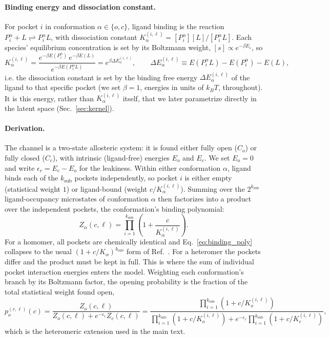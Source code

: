 \documentclass[aps,pre,superscriptaddress,floatfix,longbibliography]{revtex4-2}
\begin{document}
\paragraph{Binding energy and dissociation constant.} For pocket $i$ in
conformation $\alpha\in\{o,c\}$, ligand binding is the reaction
$P_i^\alpha + L \rightleftharpoons P_i^\alpha L$, with dissociation constant
$K_\alpha^{(i,\ell)} = [P_i^\alpha][L]/[P_i^\alpha L]$. Each species'
equilibrium concentration is set by its Boltzmann weight,
$[s]\propto e^{-\beta E_s}$, so
\begin{equation}
K_\alpha^{(i,\ell)} = \frac{e^{-\beta E(P_i^\alpha)}\,e^{-\beta E(L)}}{e^{-\beta E(P_i^\alpha L)}}
= e^{\beta \Delta E_\alpha^{(i,\ell)}},
\qquad
\Delta E_\alpha^{(i,\ell)} \equiv E(P_i^\alpha L) - E(P_i^\alpha) - E(L),
\label{eq:K_from_E}
\end{equation}
i.e. the dissociation constant is set by the binding free energy
$\Delta E_\alpha^{(i,\ell)}$ of the ligand to that specific pocket (we set
$\beta=1$, energies in units of $k_BT$, throughout). It is this energy,
rather than $K_\alpha^{(i,\ell)}$ itself, that we later parametrize directly
in the latent space (Sec.~\ref{sec:kernel}).

\paragraph{Derivation.} The channel is a two-state allosteric system: it is
found either fully open ($C_o$) or fully closed ($C_c$), with intrinsic
(ligand-free) energies $E_o$ and $E_c$. We set $E_o=0$ and write
$\epsilon_r = E_c-E_o$ for the leakiness. Within either conformation
$\alpha$, ligand binds each of the $k_\text{sub}$ pockets independently, so
pocket $i$ is either empty (statistical weight $1$) or ligand-bound (weight
$c/K_\alpha^{(i,\ell)}$). Summing over the $2^{k_\text{sub}}$
ligand-occupancy microstates of conformation $\alpha$ then factorizes into a
product over the independent pockets, the conformation's binding polynomial:
\begin{equation}
Z_\alpha(c,\ell) = \prod_{i=1}^{k_\text{sub}}\left(1+\frac{c}{K_\alpha^{(i,\ell)}}\right).
\label{eq:binding_poly}
\end{equation}
For a homomer, all pockets are chemically identical and
Eq.~\eqref{eq:binding_poly} collapses to the usual $(1+c/K_\alpha)^{k_\text{sub}}$
form of Ref.~\cite{einav_monod-wyman-changeux_2017}. For a heteromer the
pockets differ and the product must be kept in full. This is where the sum
of individual pocket interaction energies enters the model. Weighting each
conformation's branch by its Boltzmann factor, the opening probability is the
fraction of the total statistical weight found open,
\begin{equation}
p_o^{(r,\ell)}(c) = \frac{Z_o(c,\ell)}{Z_o(c,\ell) + e^{-\epsilon_r} Z_c(c,\ell)}
= \frac{\prod_{i=1}^{k_\text{sub}} (1+c/K_o^{(i,\ell)})}{\prod_{i=1}^{k_\text{sub}} (1+c/K_o^{(i,\ell)}) + e^{-\epsilon_r}\prod_{i=1}^{k_\text{sub}}(1+c/K_c^{(i,\ell)})},
\label{eq:po_heteromer}
\end{equation}
which is the heteromeric extension used in the main text.
\end{document}

